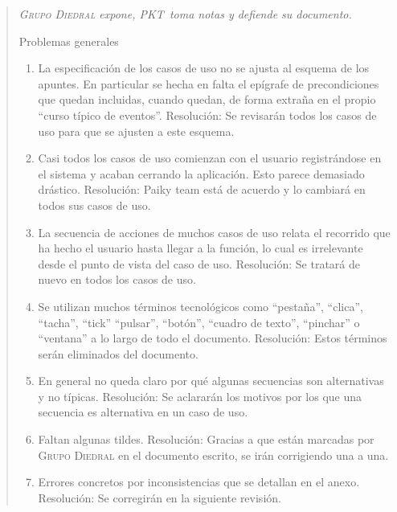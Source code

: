 \documentclass[11pt, a4paper, twoside]{report}
\newcommand*{\PKT}{P\lower2pt\hbox{K}\kern-2pt\raise2pt\hbox{T}\kern-2pt}
\begin{document}
	\begin{quotation} \itshape
			\textsc{Grupo Diedral} expone, \PKT\  toma notas y defiende su documento.

			\medskip
			Problemas generales

			\begin{enumerate}
				\item  La especificación de los casos de uso no se ajusta al esquema de los apuntes. En particular se hecha en falta el epígrafe de precondiciones que quedan incluidas, cuando quedan, de forma extraña en el propio ``curso típico de eventos''.
			Resolución: Se revisarán todos los casos de uso para que se ajusten a este esquema.
				\item Casi todos los casos de uso comienzan con el usuario registrándose en el sistema y acaban cerrando la aplicación. Esto parece demasiado drástico.
			Resolución: Paiky team está de acuerdo y lo cambiará en todos sus casos de uso.
				\item  La secuencia de acciones de muchos casos de uso relata el recorrido que ha hecho el usuario hasta llegar a la función, lo cual es irrelevante desde el punto de vista del caso de uso.
			Resolución: Se tratará de nuevo en todos los casos de uso.
				\item Se utilizan muchos términos tecnológicos como ``pestaña'', ``clica'', ``tacha'', ``tick'' ``pulsar'', ``botón'', ``cuadro de texto'', ``pinchar'' o ``ventana'' a lo largo de todo el documento.
			Resolución: Estos términos serán eliminados del documento.
				\item En general no queda claro por qué algunas secuencias son alternativas y no típicas.
			Resolución: Se aclararán los motivos por los que una secuencia es alternativa en un caso de uso.
				\item Faltan algunas tildes.
			Resolución: Gracias a que están marcadas por  \textsc{Grupo Diedral} en el documento escrito, se irán corrigiendo una a una.
				\item Errores concretos por inconsistencias que se detallan en el anexo.
			Resolución: Se corregirán en la siguiente revisión.
			\end{enumerate}


\end{quotation}
\end{document}
